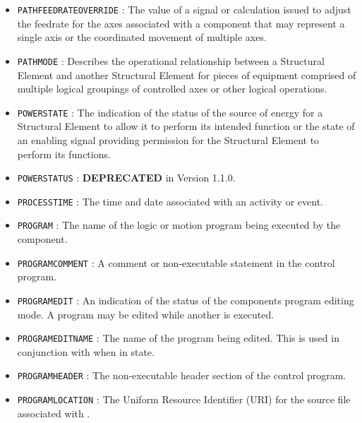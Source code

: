 \begin{itemize}
\item \texttt{PATH\textunderscore FEEDRATE\textunderscore OVERRIDE} : The value of a signal or calculation issued to adjust the feedrate for the axes associated with a  component that may represent a single axis or the coordinated movement of multiple axes. 

\item \texttt{PATH\textunderscore MODE} : Describes the operational relationship between a  \gls{Structural Element} and another  \gls{Structural Element} for pieces of equipment comprised of multiple logical groupings of controlled axes or other logical operations. 

\item \texttt{POWER\textunderscore STATE} : The indication of the status of the source of energy for a \gls{Structural Element} to allow it to perform its intended function or the state of an enabling signal providing permission for the \gls{Structural Element} to perform its functions. 

\item \texttt{POWER\textunderscore STATUS} : \textbf{DEPRECATED} in Version 1.1.0. 

\item \texttt{PROCESS\textunderscore TIME} : The time and date associated with an activity or event. 

\item \texttt{PROGRAM} : The name of the logic or motion program being executed by the  component. 

\item \texttt{PROGRAM\textunderscore COMMENT} : A comment or non-executable statement in the control program. 

\item \texttt{PROGRAM\textunderscore EDIT} : An indication of the status of the  components program editing mode. A program may be edited while another is executed. 

\item \texttt{PROGRAM\textunderscore EDIT\textunderscore NAME} : The name of the program being edited. 
 This is used in conjunction with  when in  state.  

\item \texttt{PROGRAM\textunderscore HEADER} : The non-executable header section of the control program. 

\item \texttt{PROGRAM\textunderscore LOCATION} : The Uniform Resource Identifier (URI) for the source file associated with . 


\end{itemize}

